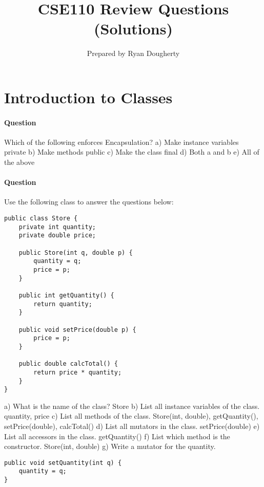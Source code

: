 \documentclass{article}
\title{CSE110 Review Questions (Solutions)}
\author{Prepared by Ryan Dougherty}
\date{}
\begin{document}
\maketitle

\section*{Introduction to Classes}


\setcounter{question_num}{1}
\paragraph{Question }
Which of the following enforces Encapsulation?
\newline a) Make instance variables private
\newline b) Make methods public
\newline c) Make the class final
\newline d) Both a and b
\newline e) All of the above

\addtocounter{question_num}{1}
\paragraph{Question }
Use the following class to answer the questions below:
\begin{lstlisting}
public class Store {
	private int quantity;
	private double price;

	public Store(int q, double p) {
		quantity = q;
		price = p;
	}

	public int getQuantity() {
		return quantity;
	}

	public void setPrice(double p) {
		price = p;
	}

	public double calcTotal() {
		return price * quantity;
	}
}
\end{lstlisting}
a) What is the name of the class? {\color{red}Store}
\newline b) List all instance variables of the class. {\color{red}quantity, price}
\newline c) List all methods of the class. {\color{red}Store(int, double), getQuantity(), setPrice(double), calcTotal()}
\newline d) List all mutators in the class. {\color{red}setPrice(double)}
\newline e) List all accessors in the class. {\color{red}getQuantity()}
\newline f) List which method is the constructor. {\color{red}Store(int, double)}
\newline g) Write a mutator for the quantity.
\begin{lstlisting}
public void setQuantity(int q) {
	quantity = q;
}
\end{lstlisting}
\end{document}
